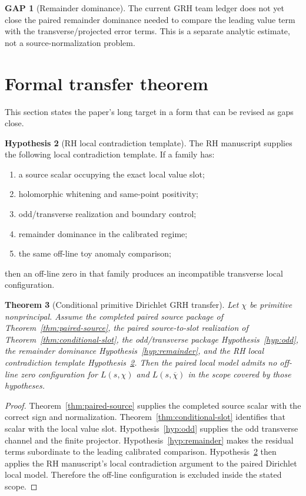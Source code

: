\documentclass[11pt,a4paper]{amsart}
\theoremstyle{plain}
\newtheorem{theorem}{Theorem}[section]
\theoremstyle{definition}
\newtheorem{hypothesis}[theorem]{Hypothesis}
\newtheorem{gap}[theorem]{GAP}
\begin{document}
\begin{gap}[Remainder dominance]
\label{gap:remainder}
The current GRH team ledger does not yet close the paired remainder dominance
needed to compare the leading value term with the transverse/projected error
terms.  This is a separate analytic estimate, not a source-normalization
problem.
\end{gap}

\section{Formal transfer theorem}
\label{sec:transfer}

This section states the paper's long target in a form that can be revised as
gaps close.

\begin{hypothesis}[RH local contradiction template]
\label{hyp:rh-template}
The RH manuscript supplies the following local contradiction template.  If a
family has:
\begin{enumerate}
\item a source scalar occupying the exact local value slot;
\item holomorphic whitening and same-point positivity;
\item odd/transverse realization and boundary control;
\item remainder dominance in the calibrated regime;
\item the same off-line toy anomaly comparison;
\end{enumerate}
then an off-line zero in that family produces an incompatible transverse local
configuration.
\end{hypothesis}

\begin{theorem}[Conditional primitive Dirichlet GRH transfer]
\label{thm:conditional-grh}
Let \(\chi\) be primitive nonprincipal.  Assume the completed paired source
package of Theorem~\ref{thm:paired-source}, the paired source-to-slot
realization of Theorem~\ref{thm:conditional-slot}, the odd/transverse package
Hypothesis~\ref{hyp:odd}, the remainder dominance
Hypothesis~\ref{hyp:remainder}, and the RH local contradiction template
Hypothesis~\ref{hyp:rh-template}.  Then the paired local model admits no
off-line zero configuration for \(L(s,\chi)\) and \(L(s,\overline\chi)\) in the
scope covered by those hypotheses.
\end{theorem}

\begin{proof}
Theorem~\ref{thm:paired-source} supplies the completed source scalar with the
correct sign and normalization.  Theorem~\ref{thm:conditional-slot} identifies
that scalar with the local value slot.  Hypothesis~\ref{hyp:odd} supplies the
odd transverse channel and the finite projector.  Hypothesis~\ref{hyp:remainder}
makes the residual terms subordinate to the leading calibrated comparison.
Hypothesis~\ref{hyp:rh-template} then applies the RH manuscript's local
contradiction argument to the paired Dirichlet local model.  Therefore the
off-line configuration is excluded inside the stated scope.
\end{proof}
\end{document}
